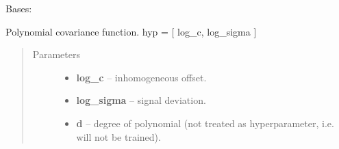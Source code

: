 \documentclass[letterpaper,10pt,english]{sphinxmanual}
\begin{document}
\begin{fulllineitems}
\label{pyGPs.Core:pyGPs.Core.cov.Poly}
Bases: 

Polynomial covariance function. hyp = {[} log\_c, log\_sigma {]}
\begin{quote}\begin{description}
\item[{Parameters}] \leavevmode\begin{itemize}
\item {} 
\textbf{log\_c} -- inhomogeneous offset.

\item {} 
\textbf{log\_sigma} -- signal deviation.

\item {} 
\textbf{d} -- degree of polynomial (not treated as hyperparameter, i.e. will not be trained).

\end{itemize}

\end{description}\end{quote}

\begin{fulllineitems}
\label{pyGPs.Core:pyGPs.Core.cov.Poly.getCovMatrix}
\end{fulllineitems}


\begin{fulllineitems}
\label{pyGPs.Core:pyGPs.Core.cov.Poly.getDerMatrix}
\end{fulllineitems}


\end{fulllineitems}

\end{document}
